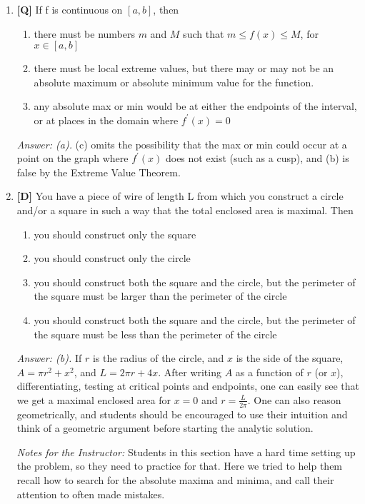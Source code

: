 \documentclass[12pt]{article}
\begin{document}
\begin{enumerate}
\bigskip

\item {\bf [Q]}  If f is continuous on $[a,b]$, then
\begin {enumerate} 
\item there must be numbers $m$ and $M$ such that $m\le f(x) \le M $, for $x\in [a,b]$ 
\item there must be local extreme values, but there may or may not be an absolute maximum or absolute minimum value for the function.
\item any absolute max or min would be at either the endpoints of the interval, or at places in the domain where $f^{\prime}(x)=0$
\end{enumerate} 

{\it Answer: (a).}  (c) omits the possibility that the max or min could occur at a point on the graph where $f^{\prime}(x)$ does not exist (such as a cusp), and (b) is false by the Extreme Value Theorem.

\item {\bf [D]} You have a piece of wire of length L from which you construct a circle and/or a square in such a way that the total enclosed area is maximal. Then
\begin {enumerate}
\item you should construct only the square
\item you should construct only the circle
\item you should construct both the square and the circle, but the perimeter of the square must be larger than the perimeter of the circle
\item you should construct both the square and the circle, but the perimeter of the square must be less than the perimeter of the circle
\end {enumerate}

{\it Answer: (b).} If $r$ is the radius of the circle, and $x$ is the side of the square, $A=\pi r^2+x^2$, and $L=2\pi r+4 x$. After writing $A$ as a function of $r$ (or $x$), differentiating, testing at critical points and endpoints, one can easily see that we get a maximal enclosed area for $x=0$ and $r=\frac{L}{2\pi}$. One can also reason geometrically, and students should be encouraged to use their intuition and think of a geometric argument before starting the analytic solution.

\bigskip

{\it Notes for the Instructor:} Students in this section have a
hard time setting up the problem, so they need to practice for
that. Here we tried to help them recall how to search for the
absolute maxima and minima, and call their attention to often made
mistakes.

\end{enumerate}
\end{document}
